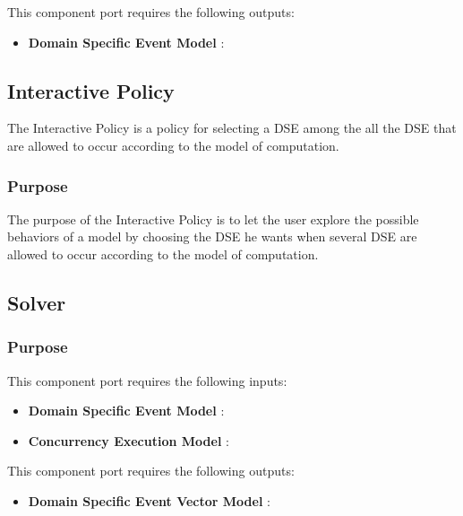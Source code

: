 \documentclass{gemoc} %
\begin{document}
This component port requires the following outputs:
\begin{itemize}
  \item \textbf{Domain Specific Event Model} :
\end{itemize}

\subsection{Interactive Policy}
The Interactive Policy is a policy for selecting a DSE among the all the DSE that are allowed to occur according to the model of computation.

\subsubsection{Purpose}
The purpose of the Interactive Policy is to let the user explore the possible behaviors of a model by choosing the DSE he wants when several DSE are allowed to occur according to the model of computation.


\subsection{Solver}


\subsubsection{Purpose}

This component port requires the following inputs:
\begin{itemize}
  \item \textbf{Domain Specific Event Model} :
  \item \textbf{Concurrency Execution Model} :
\end{itemize}

This component port requires the following outputs:
\begin{itemize}
  \item \textbf{Domain Specific Event Vector Model} :
\end{itemize}
\end{document}
